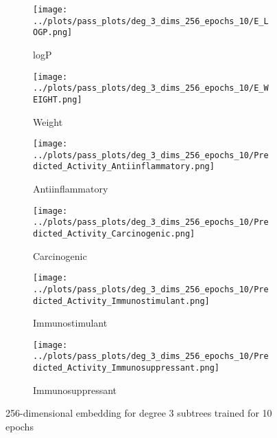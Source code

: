 \begin{figure*}
\centering

\begin{subfigure}{0.45\textwidth}
    \texttt{[image: ../plots/pass\_plots/deg\_3\_dims\_256\_epochs\_10/E\_LOGP.png]}
    \caption{logP}
\end{subfigure}
\begin{subfigure}{0.45\textwidth}
    \texttt{[image: ../plots/pass\_plots/deg\_3\_dims\_256\_epochs\_10/E\_WEIGHT.png]}
    \caption{Weight}
\end{subfigure}
\begin{subfigure}{0.45\textwidth}
    \texttt{[image: ../plots/pass\_plots/deg\_3\_dims\_256\_epochs\_10/Predicted\_Activity\_Antiinflammatory.png]}
    \caption{Antiinflammatory}
\end{subfigure}
\begin{subfigure}{0.45\textwidth}
    \texttt{[image: ../plots/pass\_plots/deg\_3\_dims\_256\_epochs\_10/Predicted\_Activity\_Carcinogenic.png]}
    \caption{Carcinogenic}
\end{subfigure}
\begin{subfigure}{0.45\textwidth}
    \texttt{[image: ../plots/pass\_plots/deg\_3\_dims\_256\_epochs\_10/Predicted\_Activity\_Immunostimulant.png]}
    \caption{Immunostimulant}
\end{subfigure}
\begin{subfigure}{0.45\textwidth}
    \texttt{[image: ../plots/pass\_plots/deg\_3\_dims\_256\_epochs\_10/Predicted\_Activity\_Immunosuppressant.png]}
    \caption{Immunosuppressant}
\end{subfigure}
\caption{256-dimensional embedding for degree 3 subtrees trained for 10 epochs}
\label{fig:deg_3_dims_256_epochs_10}
\end{figure*}


